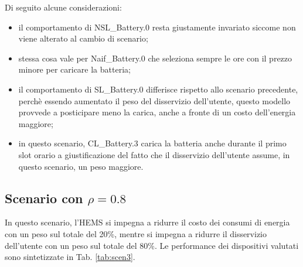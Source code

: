\documentclass[italian, Lau, oneside]{sapthesis}
\begin{document}
Di seguito alcune considerazioni:
\begin{itemize}
    \item il comportamento di NSL\_Battery.0 resta giustamente invariato siccome non viene alterato al cambio di scenario;
    \item stessa cosa vale per Naif\_Battery.0 che seleziona sempre le ore con il prezzo minore per caricare la batteria;
    \item il comportamento di SL\_Battery.0 differisce rispetto allo scenario precedente, perchè essendo aumentato il peso del disservizio dell'utente, questo modello provvede a posticipare meno la carica, anche a fronte di un costo dell'energia maggiore;
    \item in questo scenario, CL\_Battery.3 carica la batteria anche durante il primo slot orario a giustificazione del fatto che il disservizio dell'utente assume, in questo scenario, un peso maggiore.
\end{itemize}






























\subsection{Scenario con $\rho = 0.8$}
In questo scenario, l'HEMS si impegna a ridurre il costo dei consumi di energia con un peso sul totale del 20\%, mentre si impegna a ridurre il disservizio dell'utente con un peso sul totale del 80\%. Le performance dei dispositivi valutati sono sintetizzate in Tab. \ref{tab:scen3}.
\end{document}

